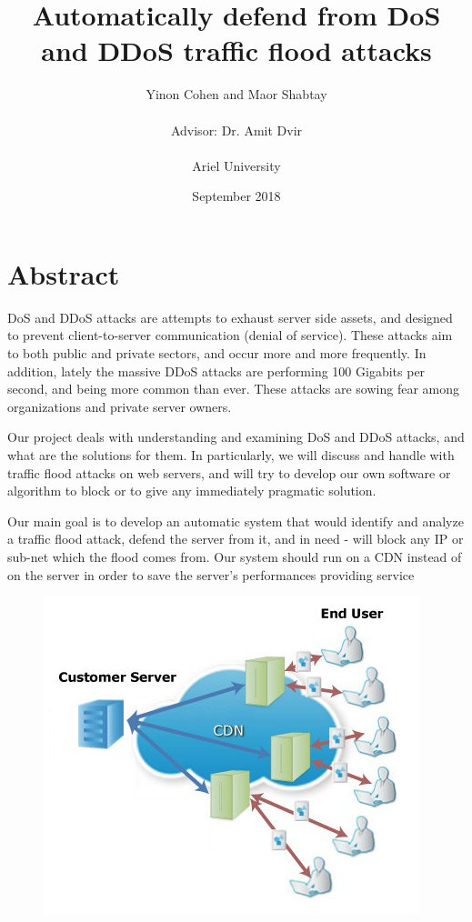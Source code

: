 \documentclass{report}
\title{Automatically defend from DoS and DDoS traffic flood attacks}
\author{Yinon Cohen and Maor Shabtay\\\\{ Advisor: Dr. Amit Dvir}\\\\{Ariel University}}
\date{September 2018}
\begin{document}
\maketitle
\tableofcontents
{}


\newpage

\chapter {Abstract}
\hfill \break \gls{DoS} and \gls{DDoS} attacks are attempts to exhaust server side assets, and designed to prevent client-to-server communication (denial of service). These attacks aim to both public and private sectors, and occur more and more frequently. In addition, lately the massive \gls{DDoS} attacks are performing 100 Gigabits per second, and being more common than ever. These attacks are sowing fear among organizations and private server owners.

\hfill \break Our project deals with understanding and examining \gls{DoS} and \gls{DDoS} attacks, and what are the solutions for them. In particularly, we will discuss and handle with traffic flood attacks on web servers, and will try to develop our own software or algorithm to block or to give any immediately pragmatic solution.

\hfill \break Our main goal is to develop an automatic system that would identify and analyze a traffic flood attack, defend the server from it, and in need - will block any \gls{IP} or sub-net which the flood comes from. Our system should run on a \gls{CDN} instead of on the server in order to save the server’s performances providing service
\hfill \break \hfill \break
\begin{figure}[h]
  \centering
        \includegraphics{pi2}
    \end{figure}
\newpage
\end{document}
